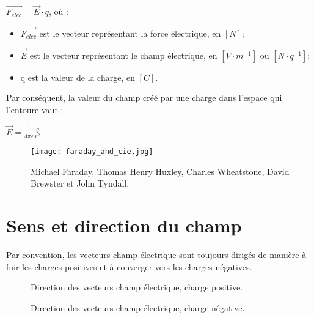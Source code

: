 \begin{encadre}
    \(\vec{F_{elec}}=\vec{E} \cdot q\), où :
    \begin{itemize}[label=\textbullet]
        \item \(\vec{F_{elec}}\) est le vecteur représentant la force électrique, en \([N]\);
        \item \(\vec{E}\) est le vecteur représentant le champ électrique, en \([V \cdot m^{-1}]\) ou \([N \cdot q^{-1}]\);
        \item q est la valeur de la charge, en \([C]\).
    \end{itemize}
\end{encadre}

Par conséquent, la valeur du champ créé par une charge dans l'espace qui l'entoure vaut :
\begin{encadre}
    \(\vec{E}=\frac{1}{4 \pi \varepsilon} \frac{q}{r^2}\)
\end{encadre}

\begin{figure}[h!]
    \centering
    \texttt{[image: faraday\_and\_cie.jpg]}
    \caption{Michael Faraday, Thomas Henry Huxley, Charles Wheatstone, David Brewster et John Tyndall.}
    \label{club5}
\end{figure}

\newpage


\section{Sens et direction du champ}
Par convention, les vecteurs champ électrique sont toujours dirigés de manière à fuir les charges positives et à converger vers les charges négatives.
\begin{figure}[!ht]
    \centering
    \begin{minipage}[b]{.47\linewidth}
        \centering
        \resizebox{.8\linewidth}{!}{}
        \caption{Direction des vecteurs champ électrique, charge positive.}
        \label{vecteur_champ_q+}
    \end{minipage}
    \begin{minipage}[b]{.47\linewidth}
        \centering
        \resizebox{.8\linewidth}{!}{}
        \caption{Direction des vecteurs champ électrique, charge négative.}
        \label{vecteur_champ_q-}
    \end{minipage}
\end{figure}

